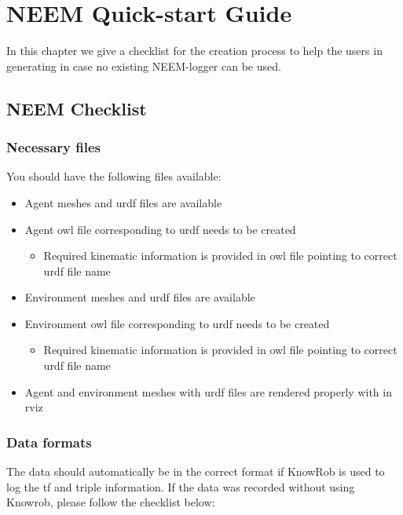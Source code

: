 \chapter{NEEM Quick-start Guide}
\label{ch:initial_checklist}

In this chapter we give a checklist for the \neems creation process to help the users in generating \neems in case no existing NEEM-logger can be used. 

\section{NEEM Checklist}

\subsection{Necessary files}
\label{sec:checklist_files}

You should have the following files available:

\begin{itemize}
	\item Agent meshes and urdf files are available
	\item Agent owl file corresponding to urdf needs to be created
	\begin{itemize}
		\item Required kinematic information is provided in owl file pointing to correct urdf file name 
	\end{itemize}
	\item Environment meshes and urdf files are available
	\item Environment owl file corresponding to urdf needs to be created
	\begin{itemize}
		\item Required kinematic information is provided in owl file pointing to correct urdf file name
	\end{itemize}
	\item Agent and environment meshes with urdf files are rendered properly with \knowrob in rviz 
\end{itemize}

\subsection{Data formats}

The data should automatically be in the correct format if KnowRob is used to log the tf and triple information. If the data was recorded without using Knowrob, please follow the checklist below:

